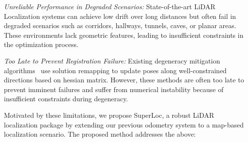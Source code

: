 \textit{Unreliable Performance in Degraded Scenarios:} 
State-of-the-art LiDAR Localization systems\cite{koide2019portable,xu2021fast} can achieve low drift over long distances but often fail in degraded scenarios such as corridors, hallways, tunnels, caves, or planar areas. These environments lack geometric features, leading to insufficient constraints in the optimization process.


\textit{Too Late to Prevent Registration Failure:} 
Existing degeneracy mitigation algorithms~\cite{zhang2016degeneracy,hinduja2019degeneracy} use solution remapping to update poses along well-constrained directions based on hessian matrix. However, these methods are often too late to prevent imminent failures and suffer from numerical instability because of insufficient constraints during degeneracy.

Motivated by these limitations, we propose SuperLoc, a robust LiDAR localization package by extending our previous odometry system \cite{zhao2021super} to a map-based localization scenario.
The proposed method addresses the above:

